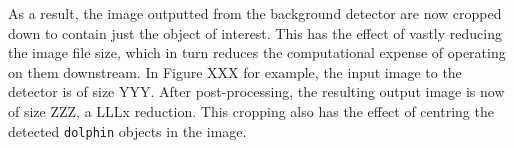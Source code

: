 As a result, the image outputted from the background detector are now cropped down to contain just the object of interest. This has the effect of vastly reducing the image file size, which in turn reduces the computational expense of operating on them downstream. In Figure XXX for example, the input image to the detector is of size YYY. After post-processing, the resulting output image is now of size ZZZ, a LLLx reduction. This cropping also has the effect of centring the detected \texttt{dolphin} objects in the image. 


%
%
%
%
%
%
